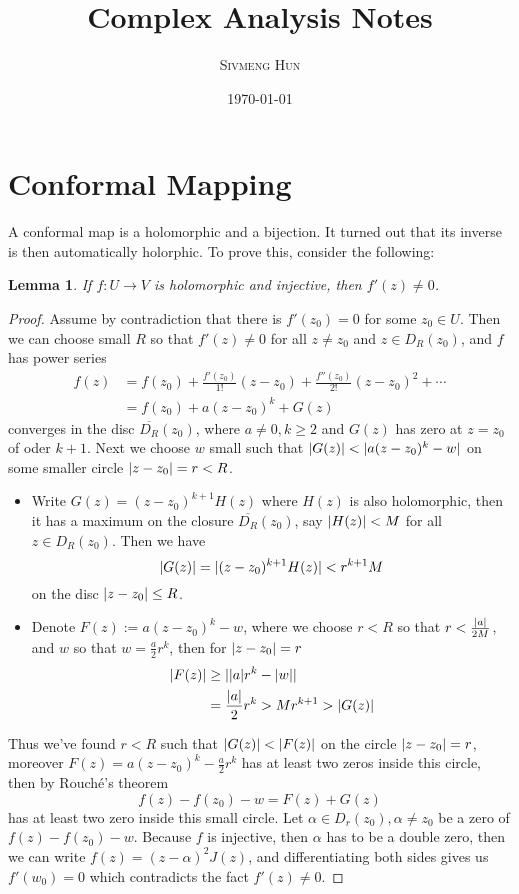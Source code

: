 \documentclass{article}
\title{Complex Analysis Notes}
\author{\textsc{Sivmeng Hun}}
\date{\today}
\DeclarePairedDelimiter\abs{\lvert}{\rvert}
\theoremstyle{plain}
\newtheorem{lemma}[theorem]{Lemma}
\theoremstyle{remark}
\begin{document}
\maketitle

\section{Conformal Mapping}
A conformal map is a holomorphic and a bijection. It turned out that its inverse is then
automatically holorphic. To prove this, consider the following:

\noindent\hrulefill
\begin{lemma}
  If $f:U\to V$ is holomorphic and injective, then $f'(z)\neq 0$.
\end{lemma}
\noindent\hrulefill
\begin{proof}
  Assume by contradiction that there is $f'(z_0)=0$ for some $z_0\in U$.
  Then we can choose small $R$ so that $f'(z)\neq 0$ for all $z\neq z_0$ and $z\in D_R(z_0)$,
  and $f$ has power series
  \begin{align*}
    f(z)
    &=f(z_0)+\frac{f'(z_0)}{1!}(z-z_0)+\frac{f''(z_0)}{2!}(z-z_0)^2+\cdots\\
    &= f(z_0) + a(z-z_0)^k + G(z)
  \end{align*}
  converges in the disc $\overline{D_R}(z_0)$, where $a\neq 0, k\geq 2$ and $G(z)$ has zero
  at $z=z_0$ of oder $k+1$. Next we choose $w$ small such that $\abs{G(z)}<\abs{a(z-z_0)^k-w}$
  on some smaller circle $\abs{z-z_0}=r<R$.
  \begin{itemize}
  \item 
    Write $G(z)=(z-z_0)^{k+1}H(z)$ where $H(z)$ is also holomorphic,
    then it has a maximum on the closure
    $\overline{D_R}(z_0)$, say $\abs{H(z)}<M$ for all $z\in D_R(z_0)$.
    Then we have
    \[\abs{G(z)}=\abs{(z-z_0)^{k+1}H(z)}<r^{k+1}M \]
    on the disc $\abs{z-z_0}\leq R$.

    
  \item Denote $F(z):=a(z-z_0)^k-w$, where we choose $r<R$ so that $r<\frac{\abs a}{2M}$,
    and $w$ so that $w=\frac{a}{2}r^k$, then for $\abs{z-z_0}=r$
    \begin{align*}
      \abs{F(z)}
      &\geq \abs{ \abs{a}r^k - \abs{w} }\\
      &= \frac{\abs a}{2}r^k > Mr^{k+1} > \abs{G(z)}
    \end{align*}
  \end{itemize}
  Thus we've found $r<R$ such that $\abs{G(z)}<\abs{F(z)}$ on the circle $\abs{z-z_0}=r$, moreover
  $F(z)=a(z-z_0)^k-\frac a2 r^k$ has at least two zeros inside this circle, then by
  Rouch{\'e}'s theorem
  \[f(z)-f(z_0)-w = F(z)+G(z)\]
  has at least two zero inside this small circle. Let $\alpha\in D_r(z_0), \alpha\neq z_0$ be a zero of
  $f(z)-f(z_0)-w$. Because $f$ is injective, then $\alpha$ has to be a double zero, then we can write
  $f(z)=(z-\alpha)^2J(z)$, and differentiating both sides gives us $f'(w_0)=0$ which contradicts
  the fact $f'(z)\neq 0$.
\end{proof}
\end{document}

